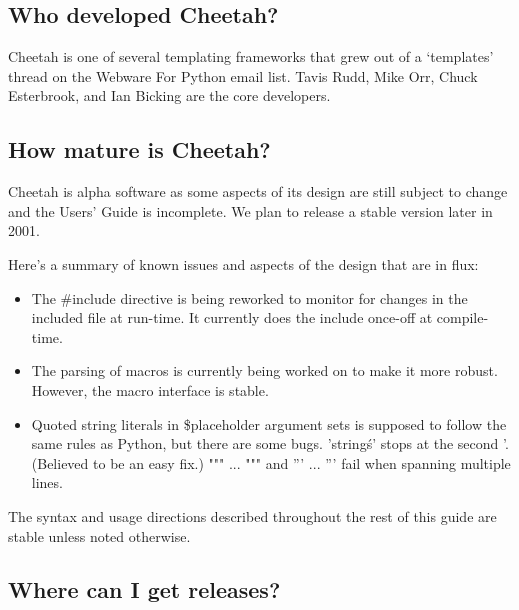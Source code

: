 \subsection{Who developed Cheetah?}
\label{intro.developers}

Cheetah is one of several templating frameworks that grew out of a `templates'
thread on the Webware For Python email list.  Tavis Rudd, Mike Orr, Chuck
Esterbrook, and Ian Bicking are the core developers.

\subsection{How mature is Cheetah?}
\label{intro.mature}

Cheetah is alpha software as some aspects of its design are
still subject to change and the Users' Guide is incomplete.
We plan to release a stable version later in 2001.

Here's a summary of known issues and aspects of the design that are in flux:
\begin{itemize}

\item The \#include directive is being reworked to monitor for changes in the
     included file at run-time. It currently does the include once-off at
     compile-time.

\item The parsing of macros is currently being worked on to make it more
     robust.  However, the macro interface is stable.
     
\item Quoted string literals in \$placeholder argument sets is supposed to
     follow the same rules as Python, but there are some bugs.  'string\'s'
     stops at the second '.  (Believed to be an easy fix.)  """ ... """ and '''
     ... ''' fail when spanning multiple lines.

\end{itemize}

The syntax and usage directions described throughout the rest of this guide are
stable unless noted otherwise.

\subsection{Where can I get releases?}
\label{intro.releases}

